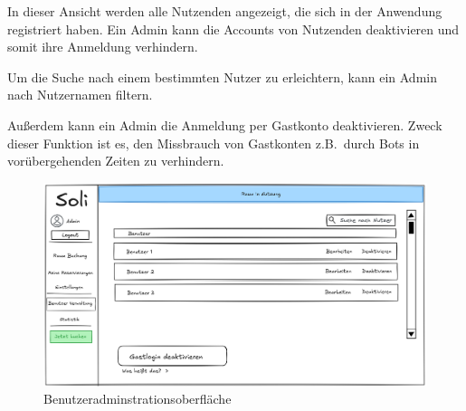 In dieser Ansicht werden alle Nutzenden angezeigt, die sich in der Anwendung registriert haben.
Ein Admin kann die Accounts von Nutzenden deaktivieren und somit ihre Anmeldung verhindern.

Um die Suche nach einem bestimmten Nutzer zu erleichtern, kann ein Admin nach Nutzernamen filtern.

Außerdem kann ein Admin die Anmeldung per Gastkonto deaktivieren.
Zweck dieser Funktion ist es, den Missbrauch von Gastkonten z.B.\ durch Bots in vorübergehenden Zeiten zu verhindern.
\clearpage
\begin{figure}[ht]
    \centering
    \includegraphics[scale=0.15]{figures/ui/useradminui}
    \caption{Benutzeradminstrationsoberfläche}
    \label{fig:adminuser}
\end{figure}

